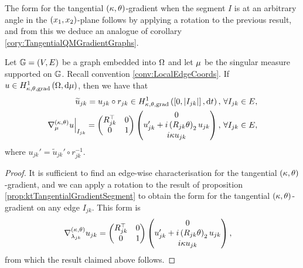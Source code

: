 The form for the tangential $\left( \kappa, \theta \right)$-gradient when the segment $I$ is at an arbitrary angle in the $\left( x_1,x_2 \right)$-plane follows by applying a rotation to the previous result, and from this we deduce an analogue of corollary \ref{cory:TangentialQMGradientGraphs}.
\begin{cory} \label{cory:ktTangentialGradientForm}
	Let $\mathbb{G}=\left( V,E \right)$ be a graph embedded into $\Omega$ and let $\mu$ be the singular measure supported on $\mathbb{G}$.
	Recall convention \ref{conv:LocalEdgeCoords}.
	If $u\in H^1_{\kappa,\theta,\mathrm{grad}}\left( \Omega, \mathrm{d}\mu \right)$, then we have that
	\begin{align*}
		\widetilde{u}_{jk} = u_{jk} \circ r_{jk} \in H^1_{\kappa,\theta,\mathrm{grad}}\left( \left[ 0,\left\lvert I_{jk} \right\rvert \right], \mathrm{d}t \right), &\ \forall I_{jk}\in E, \\
		\left.\nabla^{\left( \kappa, \theta \right)}_{\mu}u\right\vert_{I_{jk}} = \begin{pmatrix} R_{jk}^{\top} & 0 \\ 0 & 1 \end{pmatrix} \begin{pmatrix} 0 \\ u_{jk}' + i\left( R_{jk}\theta \right)_2 u_{jk} \\ i\kappa u_{jk} \end{pmatrix}, &\ \forall I_{jk}\in E,
	\end{align*}
	where $u_{jk}' = \widetilde{u}_{jk}' \circ r_{jk}^{-1}$.
\end{cory}
\begin{proof}
	It is sufficient to find an edge-wise characterisation for the tangential $\left( \kappa, \theta \right)$-gradient, and we can apply a rotation to the result of proposition \ref{prop:ktTangentialGradientSegment} to obtain the form for the tangential $\left( \kappa, \theta \right)$-gradient on any edge $I_{jk}$.
	This form is
	\begin{align*}
		\nabla^{\left( \kappa, \theta \right)}_{\lambda_{jk}}u_{jk} &= \begin{pmatrix} R_{jk}^{\top} & 0 \\ 0 & 1 \end{pmatrix} \begin{pmatrix} 0 \\ u_{jk}' + i\left( R_{jk}\theta \right)_2 u_{jk} \\ i\kappa u_{jk} \end{pmatrix},
	\end{align*}
	from which the result claimed above follows.
\end{proof}

